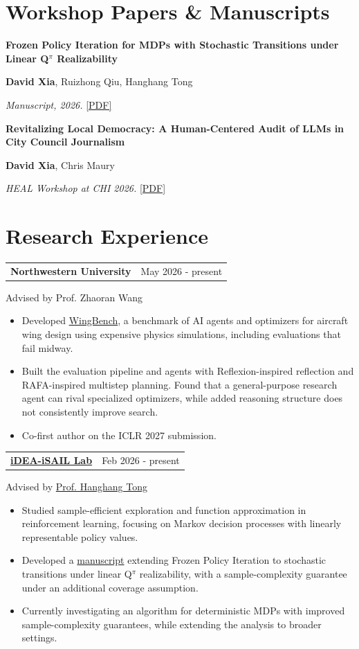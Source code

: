 \documentclass[letterpaper,11pt]{article}
\makeatletter
\newcommand{\role}[3]{\par\addvspace{3pt}\begin{tabularx}{\textwidth}{@{}Xr@{}}\textbf{#1}&\small #2\end{tabularx}\par{\small #3}\par}
\newcommand{\paper}[4]{\par\addvspace{7pt}\textbf{#1}\par #2\par\textit{#3} #4\par}
\makeatother
\begin{document}
\section{Workshop Papers \& Manuscripts}
\paper{Frozen Policy Iteration for MDPs with Stochastic Transitions under Linear Q$^{\pi}$ Realizability}
{\textbf{David Xia}, Ruizhong Qiu, Hanghang Tong}
{Manuscript, 2026.}
{\href{https://davidxia3.github.io/docs/stochastic_fpi.pdf}{[PDF]}}
\paper{Revitalizing Local Democracy: A Human-Centered Audit of LLMs in City Council Journalism}
{\textbf{David Xia}, Chris Maury}
{HEAL Workshop at CHI 2026.}
{\href{https://davidxia3.github.io/docs/heal_paper.pdf}{[PDF]}}
\section{Research Experience}
\role{Northwestern University}{May 2026 - present}{Advised by Prof. Zhaoran Wang}
\begin{itemize}
\item Developed \href{https://arxiv.org/abs/2611.28418}{WingBench}, a benchmark of AI agents and optimizers for aircraft wing design using expensive physics simulations, including evaluations that fail midway.
\item Built the evaluation pipeline and agents with Reflexion-inspired reflection and RAFA-inspired multistep planning. Found that a general-purpose research agent can rival specialized optimizers, while added reasoning structure does not consistently improve search.
\item Co-first author on the ICLR 2027 submission.
\end{itemize}
\newpage
\role{\href{https://www.idea-isail.com/index.html}{iDEA-iSAIL Lab}}{Feb 2026 - present}{Advised by \href{http://tonghanghang.org/}{Prof. Hanghang Tong}}
\begin{itemize}
\item Studied sample-efficient exploration and function approximation in reinforcement learning, focusing on Markov decision processes with linearly representable policy values.
\item Developed a \href{https://davidxia3.github.io/docs/stochastic_fpi.pdf}{manuscript} extending Frozen Policy Iteration to stochastic transitions under linear Q$^{\pi}$ realizability, with a sample-complexity guarantee under an additional coverage assumption.
\item Currently investigating an algorithm for deterministic MDPs with improved sample-complexity guarantees, while extending the analysis to broader settings.
\end{itemize}
\end{document}
